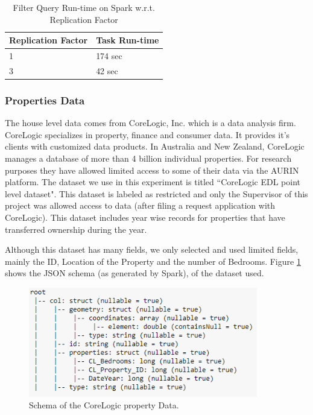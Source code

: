 \documentclass[12pt]{report}
\theoremstyle{named}
\begin{document}
\begin{table}[ht]
\centering
\begin{tabular}{@{}ll@{}}
\toprule
\multicolumn{1}{c}{\textbf{Replication Factor}} & \multicolumn{1}{c}{\textbf{Task Run-time}} \\ \midrule
1 & 174 sec \\
3 & 42 sec \\ \bottomrule
\end{tabular}
\caption{Filter Query Run-time on Spark w.r.t. Replication Factor}
\label{tab:SparkRuntime}
\end{table}
\subsubsection{Properties Data}
The house level data comes from CoreLogic\cite{CoreLogic}, Inc. which is a data analysis firm. CoreLogic specializes in property, finance and consumer data. It provides it's clients with customized data products. In Australia and New Zealand, CoreLogic manages a database of more than 4 billion individual properties. For research purposes they have allowed limited access to some of their data via the AURIN platform. The dataset we use in this experiment is titled ``CoreLogic EDL point level dataset". This dataset is labeled as restricted and only the Supervisor of this project was allowed access to data (after filing a request application with CoreLogic). This dataset includes year wise records for properties that have transferred ownership during the year. 

Although this dataset has many fields, we only selected and used limited fields, mainly the ID, Location of the Property and the number of Bedrooms. Figure \ref{fig:CoreLogicSchema} shows the JSON schema (as generated by Spark), of the dataset used.


\begin{figure}[ht]
\centering
        \includegraphics[width=100mm,scale=1]{Images/CoreLogicSchema.PNG}
    \caption{Schema of the CoreLogic property Data.}
    \label{fig:CoreLogicSchema}
\end{figure}
\end{document}
